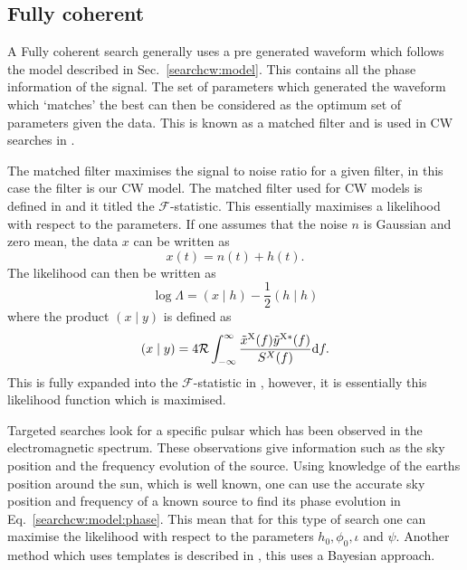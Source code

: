 \subsection{\label{searchcw:search:coherent}Fully coherent}

A Fully coherent search generally uses a pre generated waveform which follows the model described in Sec.~\ref{searchcw:model}. 
This contains all the phase information of the signal.
The set of parameters which generated the waveform which `matches' the best can then be considered as the optimum set of parameters given the data.
This is known as a matched filter \citep{} and is used in \gls{CW} searches in \citep{dupuis2005BayesianEstimation,}.

The matched filter maximises the signal to noise ratio for a given filter, in this case the filter is our \gls{CW} model. 
The matched filter used for \gls{CW} models is defined in \citep{prix2007SearchContinuous} and it titled the $\mathcal{F}$-statistic. 
This essentially maximises a likelihood with respect to the parameters.
If one assumes that the noise $n$ is Gaussian and zero mean, the data $x$ can be written as
\begin{equation}
		x(t) = n(t) + h(t).
\end{equation}
The likelihood can then be written as
\begin{equation}
		\log \Lambda = \left( x \mid h \right) - \frac{1}{2} \left( h \mid h\right) 
\end{equation}
where the product $(x \mid y)$ is defined as
\begin{equation}
		\left( x \mid y \right) = 4 \mathcal{R} \int^{\infty}_{-\infty}  \frac{\tilde{x}^{{\rm X}}(f) \tilde{y}^{{\rm X *}}(f)  }{S^{X}(f)} \mathrm{d}f.
\end{equation}
This is fully expanded into the $\mathcal{F}$-statistic in \citep{schutz1998DataAnalysis}, however, it is essentially this likelihood function which is maximised. 


Targeted searches look for a specific pulsar which has been observed in the electromagnetic spectrum.
These observations give information such as the sky position and the frequency evolution of the source.
Using knowledge of the earths position around the sun, which is well known, one can use the accurate sky position and frequency of a known source to find its phase evolution in Eq.~\ref{searchcw:model:phase}.
This mean that for this type of search one can maximise the likelihood with respect to the parameters  $h_0, \phi_0, \iota$ and $\psi$.
Another method which uses templates is described in \citep{dupuis2005BayesianEstimation}, this uses a Bayesian approach.

